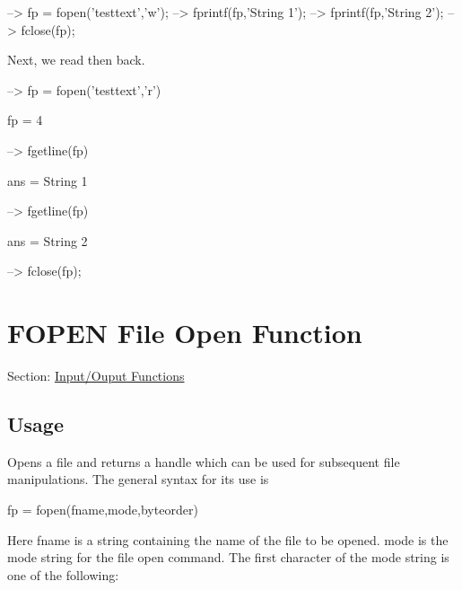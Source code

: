 \begin{DoxyVerbInclude}
--> fp = fopen('testtext','w');
--> fprintf(fp,'String 1\n');
--> fprintf(fp,'String 2\n');
--> fclose(fp);
\end{DoxyVerbInclude}


Next, we read then back.


\begin{DoxyVerbInclude}
--> fp = fopen('testtext','r')

fp = 
 4 

--> fgetline(fp)

ans = 
String 1

--> fgetline(fp)

ans = 
String 2

--> fclose(fp);
\end{DoxyVerbInclude}
 \hypertarget{io_fopen}{}\section{F\-O\-P\-E\-N File Open Function}\label{io_fopen}
Section\-: \hyperlink{sec_io}{Input/\-Ouput Functions} \hypertarget{vtkwidgets_vtkxyplotwidget_Usage}{}\subsection{Usage}\label{vtkwidgets_vtkxyplotwidget_Usage}
Opens a file and returns a handle which can be used for subsequent file manipulations. The general syntax for its use is \begin{DoxyVerb}  fp = fopen(fname,mode,byteorder)
\end{DoxyVerb}
 Here {\ttfamily fname} is a string containing the name of the file to be opened. {\ttfamily mode} is the mode string for the file open command. The first character of the mode string is one of the following\-: 
